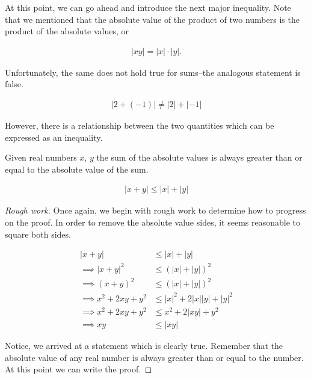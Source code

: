 \documentclass{report}
\begin{document}
At this point, we can go ahead and introduce the next major inequality. Note that we mentioned that the absolute value of the product of two numbers is the product of the absolute values, or

\begin{align*}
	|xy| = |x| \cdot |y|.
\end{align*}

Unfortunately, the same does not hold true for sums--the analogous statement is false.

\begin{align*}
	|2 + (-1)| \neq |2| + |-1|
\end{align*}

However, there is a relationship between the two quantities which can be expressed as an inequality. \\

\begin{theorem}
	Given real numbers $x$, $y$ the sum of the absolute values is always greater than or equal to the absolute value of the sum.
	
	\begin{align}
		|x + y| \le |x| + |y|
	\end{align}
\end{theorem}

\begin{proof}[Rough work]\let\qed\relax
	Once again, we begin with rough work to determine how to progress on the proof. In order to remove the absolute value sides, it seems reasonable to square both sides.
	
	\begin{align*}
		|x + y| &\le |x| + |y| \\
		\implies |x + y|^2 &\le (|x| + |y|)^2 \\
		\implies (x + y)^2 &\le (|x| + |y|)^2 \\
		\implies x^2 + 2xy + y^2 &\le |x|^2 + 2|x||y| + |y|^2 \\
		\implies x^2 + 2xy + y^2 &\le x^2 + 2|xy| + y^2 \\
		\implies xy &\le |xy|
	\end{align*}
	
	Notice, we arrived at a statement which is clearly true. Remember that the absolute value of any real number is always greater than or equal to the number. At this point we can write the proof.
\end{proof}
\vspace{\baselineskip}
\end{document}
